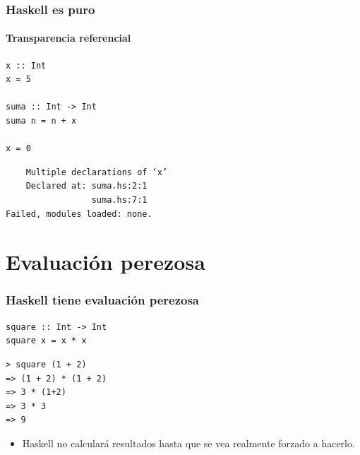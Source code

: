 \documentclass{beamer}
\begin{document}

\begin{frame}[fragile]
  \frametitle{Haskell es puro}
  \framesubtitle{Transparencia referencial}
  
\begin{lstlisting}
x :: Int
x = 5

suma :: Int -> Int
suma n = n + x

x = 0
\end{lstlisting}

\vspace{0.3cm}

{\color{red}
\begin{verbatim}
    Multiple declarations of ‘x’
    Declared at: suma.hs:2:1
                 suma.hs:7:1
Failed, modules loaded: none.

\end{verbatim}}

\end{frame}


\section{Evaluación perezosa}

\begin{frame}[fragile]
  \frametitle{Haskell tiene evaluación perezosa}

\begin{lstlisting}
square :: Int -> Int
square x = x * x
\end{lstlisting}

\begin{lstlisting}[numbers=none, backgroundcolor=\color{lightgray}, keywordstyle=\color{black}]
> square (1 + 2)
=> (1 + 2) * (1 + 2)
=> 3 * (1+2)
=> 3 * 3
=> 9
\end{lstlisting}

\vspace{0.3cm}

\begin{itemize}
\item Haskell no calculará resultados hasta que se vea realmente forzado a hacerlo. 
\end{itemize}

\end{frame}
\end{document}
